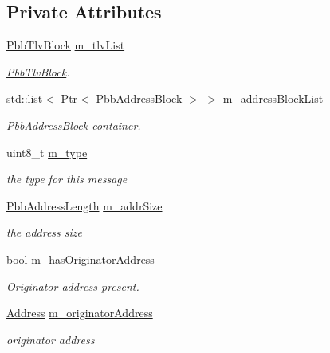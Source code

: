 \subsection*{Private Attributes}
\begin{DoxyCompactItemize}
\item 
\hyperlink{classns3_1_1PbbTlvBlock}{Pbb\+Tlv\+Block} \hyperlink{classns3_1_1PbbMessage_a9cb5f9be8bab80d5f7fc47338425c072}{m\+\_\+tlv\+List}
\begin{DoxyCompactList}\small\item\em \hyperlink{classns3_1_1PbbTlvBlock}{Pbb\+Tlv\+Block}. \end{DoxyCompactList}\item 
\hyperlink{openflow-interface_8h_afd9bcfa176617760671b67580f536fa7}{std\+::list}$<$ \hyperlink{classns3_1_1Ptr}{Ptr}$<$ \hyperlink{classns3_1_1PbbAddressBlock}{Pbb\+Address\+Block} $>$ $>$ \hyperlink{classns3_1_1PbbMessage_a03b5fb172d93f0e6b4997148bd703ff1}{m\+\_\+address\+Block\+List}
\begin{DoxyCompactList}\small\item\em \hyperlink{classns3_1_1PbbAddressBlock}{Pbb\+Address\+Block} container. \end{DoxyCompactList}\item 
uint8\+\_\+t \hyperlink{classns3_1_1PbbMessage_afb41a4f87baf9e01a9fe825a6f012691}{m\+\_\+type}
\begin{DoxyCompactList}\small\item\em the type for this message \end{DoxyCompactList}\item 
\hyperlink{namespacens3_a79988e6e8b09f64c6ffca894994cb033}{Pbb\+Address\+Length} \hyperlink{classns3_1_1PbbMessage_ad2248d17e3198d4232dbe1043e045a53}{m\+\_\+addr\+Size}
\begin{DoxyCompactList}\small\item\em the address size \end{DoxyCompactList}\item 
bool \hyperlink{classns3_1_1PbbMessage_a6af27be08950729426e800f5d7564548}{m\+\_\+has\+Originator\+Address}
\begin{DoxyCompactList}\small\item\em Originator address present. \end{DoxyCompactList}\item 
\hyperlink{classns3_1_1Address}{Address} \hyperlink{classns3_1_1PbbMessage_a276c7a94804be19b5436a7605deeb271}{m\+\_\+originator\+Address}
\begin{DoxyCompactList}\small\item\em originator address \end{DoxyCompactList}\item 

\end{DoxyCompactItemize}
